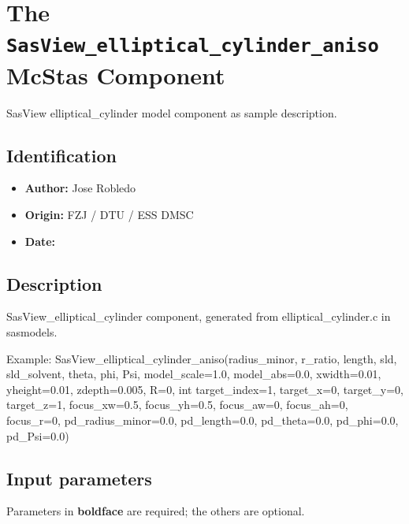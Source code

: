 \section{The \texttt{SasView\_elliptical\_cylinder\_aniso} McStas Component}
SasView elliptical\_cylinder model component as sample description.

\subsection*{Identification}
\begin{itemize}
  \item \textbf{Author:} Jose Robledo
  \item \textbf{Origin:} FZJ / DTU / ESS DMSC
  \item \textbf{Date:} 
\end{itemize}

\subsection*{Description}
SasView\_elliptical\_cylinder component, generated from elliptical\_cylinder.c in sasmodels.

Example: SasView\_elliptical\_cylinder\_aniso(radius\_minor, r\_ratio, length, sld, sld\_solvent, theta, phi, Psi, model\_scale=1.0, model\_abs=0.0, xwidth=0.01, yheight=0.01, zdepth=0.005, R=0, int target\_index=1, target\_x=0, target\_y=0, target\_z=1, focus\_xw=0.5, focus\_yh=0.5, focus\_aw=0, focus\_ah=0, focus\_r=0, pd\_radius\_minor=0.0, pd\_length=0.0, pd\_theta=0.0, pd\_phi=0.0, pd\_Psi=0.0)

\subsection*{Input parameters}
Parameters in \textbf{boldface} are required; the others are optional.

